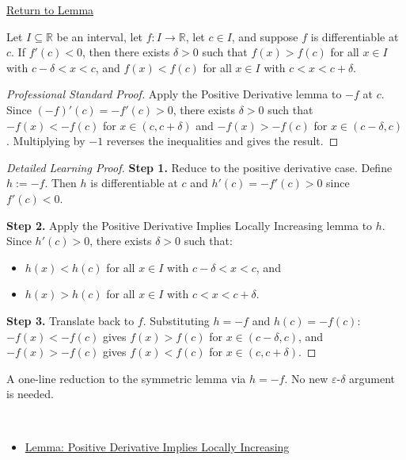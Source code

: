 \newpage
{}
\label{prf:negative-derivative-implies-locally-decreasing}

\begin{remark*}[Return]
\hyperref[lem:negative-derivative-implies-locally-decreasing]{Return to Lemma}
\end{remark*}

\begin{lemma*}
Let $I \subseteq \mathbb{R}$ be an interval, let $f : I \to \mathbb{R}$, let $c \in I$, and suppose $f$ is differentiable at $c$. If $f'(c) < 0$, then there exists $\delta > 0$ such that $f(x) > f(c)$ for all $x \in I$ with $c - \delta < x < c$, and $f(x) < f(c)$ for all $x \in I$ with $c < x < c + \delta$.
\end{lemma*}

\begin{proof}[Professional Standard Proof]
\LRAProofBodyStart
Apply the Positive Derivative lemma to $-f$ at $c$. Since $(-f)'(c) = -f'(c) > 0$, there exists $\delta > 0$ such that $-f(x) < -f(c)$ for $x \in (c,c+\delta)$ and $-f(x) > -f(c)$ for $x \in (c-\delta,c)$. Multiplying by $-1$ reverses the inequalities and gives the result.
\end{proof}

\begin{proof}[Detailed Learning Proof]
\LRAProofBodyStart

\textbf{Step 1.} Reduce to the positive derivative case. Define $h := -f$. Then $h$ is differentiable at $c$ and $h'(c) = -f'(c) > 0$ since $f'(c) < 0$.

\textbf{Step 2.} Apply the Positive Derivative Implies Locally Increasing lemma to $h$. Since $h'(c) > 0$, there exists $\delta > 0$ such that:
\begin{itemize}
  \item $h(x) < h(c)$ for all $x \in I$ with $c - \delta < x < c$, and
  \item $h(x) > h(c)$ for all $x \in I$ with $c < x < c + \delta$.
\end{itemize}

\textbf{Step 3.} Translate back to $f$. Substituting $h = -f$ and $h(c) = -f(c)$: $-f(x) < -f(c)$ gives $f(x) > f(c)$ for $x \in (c-\delta,c)$, and $-f(x) > -f(c)$ gives $f(x) < f(c)$ for $x \in (c,c+\delta)$.
\end{proof}

\begin{remark*}
A one-line reduction to the symmetric lemma via $h = -f$. No new $\varepsilon$-$\delta$ argument is needed.
\end{remark*}

\begin{remark*}[Dependencies]~\\
\begin{itemize}
  \item \hyperref[lem:positive-derivative-implies-locally-increasing]{Lemma: Positive Derivative Implies Locally Increasing}
\end{itemize}
\end{remark*}

\clearpage
